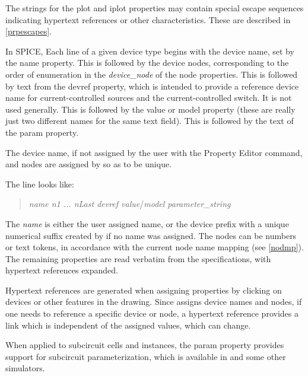 The strings for the {\et plot} and {\et iplot} properties may contain
special escape sequences indicating hypertext references or other
characteristics.  These are described in \ref{prpescapes}.


\label {spiceline}
In SPICE, Each line of a given device type begins with the device
name, set by the {\et name} property.  This is followed by the device
nodes, corresponding to the order of enumeration in the {\it
device\_node\/} of the {\et node} properties.  This is followed by
text from the {\et devref} property, which is intended to provide a
reference device name for current-controlled sources and the
current-controlled switch.  It is not used generally.  This is
followed by the {\et value} or {\et model} property (these are really
just two different names for the same text field).  This is followed
by the text of the {\et param} property.

The device name, if not assigned by the user with the {\cb Property
Editor} command, and nodes are assigned by {\Xic} so as to be unique.

The line looks like:
\begin{quote}
{\it name n1 ... nLast devref value\/}/{\it model parameter\_string}
\end{quote}

The {\it name} is either the user assigned name, or the device prefix
with a unique numerical suffix created by {\Xic} if no name was
assigned.  The nodes can be numbers or text tokens, in accordance with
the current node name mapping (see \ref{nodmp}).  The remaining
properties are read verbatim from the specifications, with hypertext
references expanded.

Hypertext references are generated when assigning properties by
clicking on devices or other features in the drawing.  Since {\Xic}
assigns device names and nodes, if one needs to reference a specific
device or node, a hypertext reference provides a link which is
independent of the assigned values, which can change.

When applied to subcircuit cells and instances, the {\cb param}
property provides support for subcircuit parameterization, which is
available in {\WRspice} and some other simulators.

